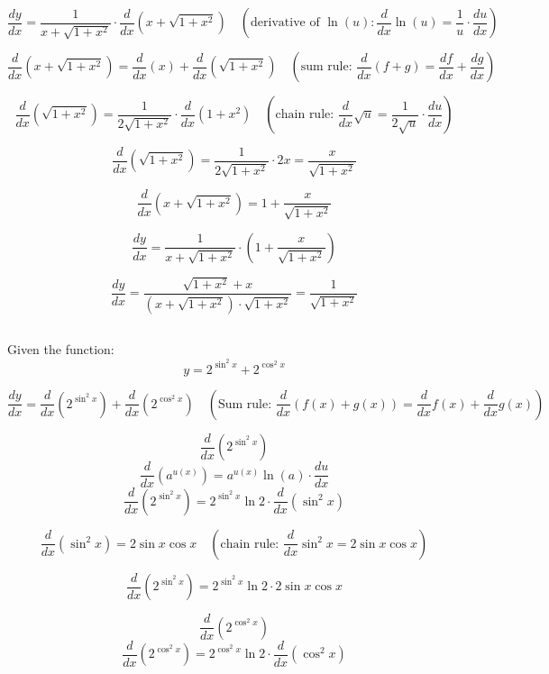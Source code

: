 \documentclass{article}
\begin{document}
	
	\[
	\frac{dy}{dx} = \frac{1}{x + \sqrt{1 + x^2}} \cdot \frac{d}{dx}\left(x + \sqrt{1 + x^2}\right)
	\quad (\text{derivative of } \ln(u): \frac{d}{dx}\ln(u) = \frac{1}{u} \cdot \frac{du}{dx})
	\]
	

	\[
	\frac{d}{dx}\left(x + \sqrt{1 + x^2}\right) 
	= \frac{d}{dx}(x) + \frac{d}{dx}\left(\sqrt{1 + x^2}\right)
	\quad (\text{sum rule: } \frac{d}{dx}(f + g) = \frac{df}{dx} + \frac{dg}{dx})
	\]
	

	\[
	\frac{d}{dx}\left(\sqrt{1 + x^2}\right) 
	= \frac{1}{2\sqrt{1 + x^2}} \cdot \frac{d}{dx}(1 + x^2)
	\quad (\text{chain rule: } \frac{d}{dx}\sqrt{u} = \frac{1}{2\sqrt{u}} \cdot \frac{du}{dx})
	\]
	
	

	\[
	\frac{d}{dx}\left(\sqrt{1 + x^2}\right) = \frac{1}{2\sqrt{1 + x^2}} \cdot 2x = \frac{x}{\sqrt{1 + x^2}}
	\]
	

	\[
	\frac{d}{dx}\left(x + \sqrt{1 + x^2}\right) = 1 + \frac{x}{\sqrt{1 + x^2}}
	\]
	

	\[
	\frac{dy}{dx} = \frac{1}{x + \sqrt{1 + x^2}} \cdot \left(1 + \frac{x}{\sqrt{1 + x^2}}\right)
	\]
	

	\[
	\frac{dy}{dx} = \frac{\sqrt{1 + x^2} + x}{(x + \sqrt{1 + x^2}) \cdot \sqrt{1 + x^2}} = 	\boxed{ \frac{1}{\sqrt{1 + x^2}}}
	\]
	
\subsection{}

Given the function:
\[
y = 2^{\sin^2{x}} + 2^{\cos^2{x}}
\]


\[
\frac{dy}{dx} = \frac{d}{dx} \left( 2^{\sin^2{x}} \right) + \frac{d}{dx} \left( 2^{\cos^2{x}} \right)
\quad (\text{Sum rule: } \frac{d}{dx}(f(x) + g(x)) = \frac{d}{dx}f(x) + \frac{d}{dx}g(x))
\]

\[
\frac{d}{dx} \left( 2^{\sin^2{x}} \right)
\]
\[
\frac{d}{dx} \left( a^{u(x)} \right) = a^{u(x)} \ln(a) \cdot \frac{du}{dx}
\]
\[
\frac{d}{dx} \left( 2^{\sin^2{x}} \right) = 2^{\sin^2{x}} \ln{2} \cdot \frac{d}{dx} \left( \sin^2{x} \right)
\]

\[
\frac{d}{dx} \left( \sin^2{x} \right) = 2 \sin{x} \cos{x}
\quad (\text{chain rule: } \frac{d}{dx} \sin^2{x} = 2 \sin{x} \cos{x})
\]

\[
\frac{d}{dx} \left( 2^{\sin^2{x}} \right) = 2^{\sin^2{x}} \ln{2} \cdot 2 \sin{x} \cos{x}
\]

\[
\frac{d}{dx} \left( 2^{\cos^2{x}} \right)
\]
\[
\frac{d}{dx} \left( 2^{\cos^2{x}} \right) = 2^{\cos^2{x}} \ln{2} \cdot \frac{d}{dx} \left( \cos^2{x} \right)
\]
\end{document}
